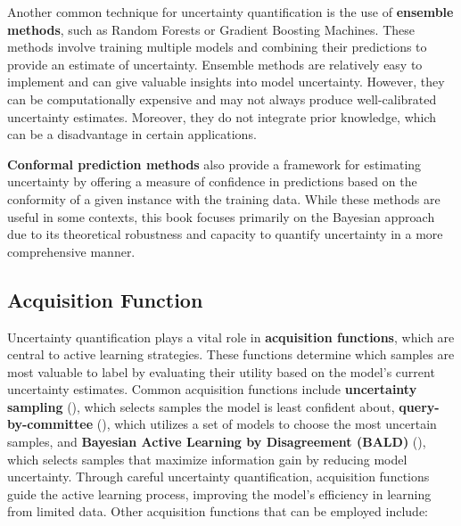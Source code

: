 \documentclass[
  letterpaper,
  numbers=noenddot,
  DIV=11]{scrreprt}
\theoremstyle{definition}
\theoremstyle{plain}
\theoremstyle{plain}
\theoremstyle{remark}
\begin{document}
Another common technique for uncertainty quantification is the use of
\textbf{ensemble methods}, such as Random Forests or Gradient Boosting
Machines. These methods involve training multiple models and combining
their predictions to provide an estimate of uncertainty. Ensemble
methods are relatively easy to implement and can give valuable insights
into model uncertainty. However, they can be computationally expensive
and may not always produce well-calibrated uncertainty estimates.
Moreover, they do not integrate prior knowledge, which can be a
disadvantage in certain applications.

\textbf{Conformal prediction methods} also provide a framework for
estimating uncertainty by offering a measure of confidence in
predictions based on the conformity of a given instance with the
training data. While these methods are useful in some contexts, this
book focuses primarily on the Bayesian approach due to its theoretical
robustness and capacity to quantify uncertainty in a more comprehensive
manner.

\subsection{Acquisition Function}\label{acquisition-function}

Uncertainty quantification plays a vital role in \textbf{acquisition
functions}, which are central to active learning strategies. These
functions determine which samples are most valuable to label by
evaluating their utility based on the model's current uncertainty
estimates. Common acquisition functions include \textbf{uncertainty
sampling} (), which
selects samples the model is least confident about,
\textbf{query-by-committee} (), which utilizes a set of models to choose the most uncertain
samples, and \textbf{Bayesian Active Learning by Disagreement (BALD)}
(), which selects samples
that maximize information gain by reducing model uncertainty. Through
careful uncertainty quantification, acquisition functions guide the
active learning process, improving the model's efficiency in learning
from limited data. Other acquisition functions that can be employed
include:
\end{document}
